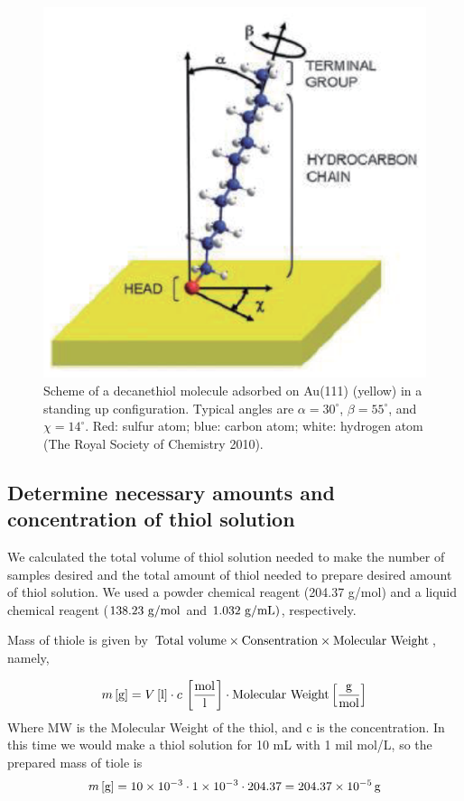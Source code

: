 \begin{figure}[h]
\centering
\includegraphics[width=0.6\columnwidth]{sam2.eps}
\caption{
Scheme of a decanethiol molecule adsorbed on Au(111) (yellow) in a standing up configuration.
Typical angles are $\alpha=30^\circ$, $\beta=55^\circ$, and $\chi=14^\circ$. Red: sulfur atom; blue: carbon atom; white: hydrogen atom (The Royal Society of Chemistry 2010).}
\label{sam2}
\end{figure}


\subsection{Determine necessary amounts and concentration of thiol solution}

We calculated the total volume of thiol solution needed to make the number of samples desired and the total amount of thiol needed to prepare desired amount of thiol solution. We used a powder chemical reagent (204.37 g/mol) and a liquid chemical reagent ($138.23 \ {\rm g/mol}$ and $1.032 \ {\rm g/mL})$, respectively. 

Mass of thiole is given by 
$ {\rm Total\ volume \times Consentration \times Molecular \ Weight}$, namely,

\begin{equation}
 m\, [{\rm g}]=V \, [{\rm l}] \cdot c \, \left[ \frac{{{\rm mol}}}{\rm l}\right] \cdot 
\text{Molecular Weight} \left[ \frac{\rm g}{{\rm mol}}\right]
\end{equation}
Where MW is the Molecular Weight of the thiol, and c is the concentration.
In this time we would make a thiol solution for 10 mL with 1 mil mol/L, so the prepared mass of tiole is 
\begin{eqnarray}
m\, [{\rm g}]=10\times 10^{-3}\cdot 1\times 10^{-3} 
\cdot  204.37  \nonumber
=204.37 \times 10^{-5} \, {\rm g}
\end{eqnarray}

